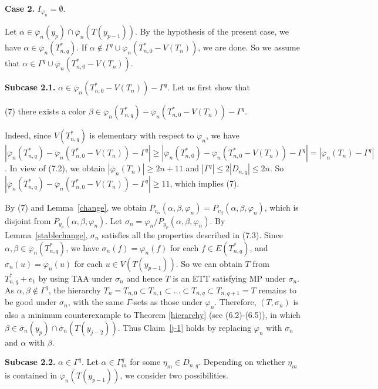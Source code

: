 \documentclass[11pt]{article}
\newcommand{\phibar}{\overline{\varphi}}
\begin{document}
{\bf Case 2.} $I_{\varphi_n}=\emptyset$. 

Let $\alpha\in \overline{\varphi}_n(y_p)\cap\overline{\varphi}_n(T(y_{p-1}))$. By the hypothesis of the present
case, we have $\alpha\in\phibar_n(T_{n,q}^*)$. If $\alpha\notin\Gamma^q\cup \phibar_n(T_{n,0}^*-V(T_n))$, 
we are done. So we assume that $\alpha\in \Gamma^q\cup \phibar_n(T_{n,0}^*-V(T_n))$.  
 
{\bf Subcase 2.1.} $\alpha\in \phibar_n(T_{n,0}^*-V(T_n))-\Gamma^q$. Let us first show that

(7) there exists a color $\beta\in\phibar_n(T_{n,q}^*)-\phibar_n(T_{n,0}^*-V(T_n))-\Gamma^q$. 

Indeed, since $V(T_{n,q}^*)$ is elementary with respect to $\varphi_n$, we have $|\phibar_n(T_{n,q}^*)-\phibar_n(T_{n,0}^*-V(T_n))-
\Gamma^q| \ge |\phibar_n(T_{n,0}^*)- \phibar_n(T_{n,0}^*-V(T_n))-\Gamma^q| = |\phibar_n(T_n)- \Gamma^q|$.
In view of (7.2), we obtain $|\phibar_n(T_{n})|\ge 2n+11$ and $|\Gamma^q| \le 2 |D_{n,q}|\le 2n$. So 
$|\phibar_n(T_{n,q}^*)-\phibar_n(T_{n,0}^*-V(T_n))-\Gamma^q| \ge 11$, which implies (7).

By (7) and Lemma~\ref{change}, we obtain $P_{v_{\alpha}} (\alpha, \beta, \varphi_n) = P_{v_{\beta}}(\alpha, \beta, \varphi_n)$, 
which is disjoint from $P_{y_p}(\alpha, \beta, \varphi_n)$.  Let $\sigma_n=\varphi_n/P_{y_p}(\alpha, \beta, \varphi_n)$. By Lemma~\ref{stablechange},  $\sigma_n$ satisfies all the properties described in (7.3). Since $\alpha, \beta\in
\phibar_n(T_{n,q}^*)$, we have $\sigma_n(f)=\varphi_n(f)$ for each $f\in E(T_{n,q}^*)$, and $\overline{\sigma}_n(u)=\overline{\varphi}_n(u)$ for each $u\in V(T(y_{p-1}))$.  So we can obtain $T$ from 
$T_{n,q}^*+e_1$ by using TAA under $\sigma_n$ and hence $T$ is an ETT satisfying MP under $\sigma_n$. As $\alpha, \beta \notin \Gamma^q$, 
the hierarchy $T_n=T_{n,0} \subset T_{n,1} \subset \ldots \subset T_{n,q} \subset T_{n,q+1}=T$ remains to 
be good under $\sigma_n$, with the same $\Gamma$-sets as those under $\varphi_n$. Therefore, $(T, \sigma_n)$ is also a 
minimum counterexample to Theorem \ref{hierarchy} (see (6.2)-(6.5)), in which $\beta \in \overline{\sigma}_n(y_p)\cap\overline{\sigma}_n(T(y_{j-2}))$. 
Thus Claim~\ref{j-1} holds by replacing $\varphi_n$ with $\sigma_n$ and $\alpha$ with $\beta$. 


{\bf Subcase 2.2.}  $\alpha\in \Gamma^q$. Let $\alpha \in\Gamma^{q}_m$ for some $\eta_{m}\in D_{n,q}$. Depending on
whether $\eta_m$ is contained in $\phibar_n(T(y_{p-1}))$, we consider two possibilities.
\end{document}
